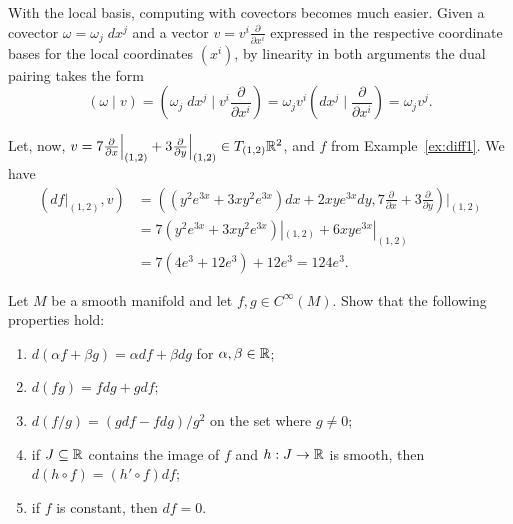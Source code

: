 With the local basis, computing with covectors becomes much easier.
Given a covector $\omega = \omega_j\; dx^j$ and a vector $v = v^i \frac{\partial}{\partial x^i}$ expressed in the respective coordinate bases for the local coordinates $(x^i)$, by linearity in both arguments the dual pairing takes the form
\begin{equation}\label{eq:localdualpairing}
	(\omega \mid v) =
	\left(\omega_j\; dx^j \;\Big |\; v^i \frac{\partial}{\partial x^i} \right) =
	\omega_j v^i \left(dx^j \;\Big |\; \frac{\partial}{\partial x^i} \right) =
	\omega_j v^j.
\end{equation}

\begin{example}
	Let, now, $v = 7 \frac{\partial}{\partial x}\Big|_{(1,2)} + 3 \frac{\partial}{\partial y}\Big|_{(1,2)}\in T_{(1,2)}\mathbb{R}^2$, and $f$ from Example~\ref{ex:diff1}.
	We have
	\begin{align}
		(df|_{(1,2)}, v)
		 & = \left((y^2 e^{3x} +3xy^2 e^{3x}) dx + 2xy e^{3x} dy, 7 \frac{\partial}{\partial x} + 3 \frac{\partial}{\partial y} \right)\Big|_{(1,2)} \\
		 & = 7(y^2 e^{3x} +3xy^2 e^{3x})|_{(1,2)} + 6 xy e^{3x}|_{(1,2)}                                                                             \\
		 & = 7(4 e^3 + 12 e^3) + 12 e^3 = 124e^3.
	\end{align}
\end{example}

\begin{exercise}
	Let $M$ be a smooth manifold and let $f,g\in C^\infty(M)$. Show that the following properties hold:
	\begin{enumerate}
		\item $d(\alpha f + \beta g) = \alpha df + \beta dg$ for $\alpha,\beta\in\mathbb{R}$;
		\item $d(fg) = f dg + g df$;
		\item $d(f/g) = (g df - f dg)/g^2$ on the set where $g\neq 0$;
		\item if $J\subseteq\mathbb{R}$ contains the image of $f$ and $h:J\to\mathbb{R}$ is smooth, then $d(h\circ f) = (h'\circ f) df$;
		\item if $f$ is constant, then $df= 0$.
	\end{enumerate}
\end{exercise}

